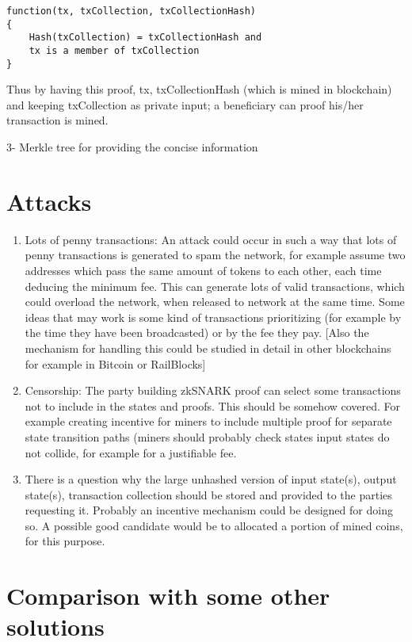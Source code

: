 \documentclass{article}
\begin{document}
\begin{verbatim}
function(tx, txCollection, txCollectionHash)
{
	Hash(txCollection) = txCollectionHash and
	tx is a member of txCollection 
}
\end{verbatim}

Thus by having this proof, tx, txCollectionHash (which is mined in blockchain) and keeping txCollection as private input; a beneficiary can proof his/her transaction is mined.

3- Merkle tree for providing the concise information

\section{Attacks}

\begin{enumerate}
\item Lots of penny transactions: An attack could occur in such a way that lots of penny transactions is generated to spam the network, for example assume two addresses which pass the same amount of tokens to each other, each time deducing the minimum fee. This can generate lots of valid transactions, which could overload the network, when released to network at the same time. Some ideas that may work is some kind of transactions prioritizing (for example by the time they have been broadcasted) or by the fee they pay. [Also the mechanism for handling this could be studied in detail in other blockchains for example in Bitcoin or RailBlocks]

\item Censorship: The party building zkSNARK proof can select some transactions not to include in the states and proofs. This should be somehow covered.  For example creating incentive for miners to include multiple proof for separate state transition paths (miners should probably check states input states do not collide, for example for a justifiable fee.

\item There is a question why the large unhashed version of input state(s), output state(s), transaction collection should be stored and provided to the parties requesting it. Probably an incentive mechanism could be designed for doing so. A possible good candidate would be to allocated a portion of mined coins, for this purpose.

\end{enumerate}

\section{Comparison with some other solutions}
\end{document}
